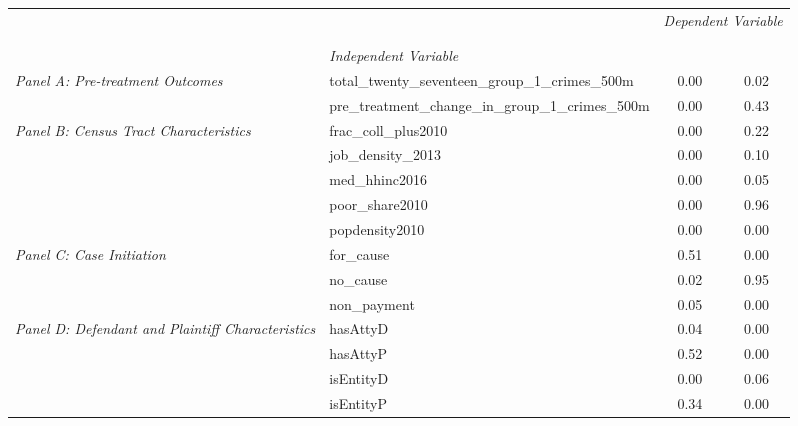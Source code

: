 \begin{tabular}{llcc}
\toprule
 &  & \multicolumn{2}{c}{\textit{Dependent Variable}} \\
\cline{3-4}
\\
 &  &  &  \\
 & \emph{Independent Variable} &  &  \\
\midrule
\multirow[c]{2}{3cm}{\textit{Panel A: Pre-treatment Outcomes}} & total_twenty_seventeen_group_1_crimes_500m & 0.00 & 0.02 \\
 & pre_treatment_change_in_group_1_crimes_500m & 0.00 & 0.43 \\
\cline{1-4}
\multirow[c]{5}{3cm}{\textit{Panel B: Census Tract Characteristics}} & frac_coll_plus2010 & 0.00 & 0.22 \\
 & job_density_2013 & 0.00 & 0.10 \\
 & med_hhinc2016 & 0.00 & 0.05 \\
 & poor_share2010 & 0.00 & 0.96 \\
 & popdensity2010 & 0.00 & 0.00 \\
\cline{1-4}
\multirow[c]{3}{3cm}{\textit{Panel C: Case Initiation}} & for_cause & 0.51 & 0.00 \\
 & no_cause & 0.02 & 0.95 \\
 & non_payment & 0.05 & 0.00 \\
\cline{1-4}
\multirow[c]{4}{3cm}{\textit{Panel D: Defendant and Plaintiff Characteristics}} & hasAttyD & 0.04 & 0.00 \\
 & hasAttyP & 0.52 & 0.00 \\
 & isEntityD & 0.00 & 0.06 \\
 & isEntityP & 0.34 & 0.00 \\
\cline{1-4}
\bottomrule
\end{tabular}

